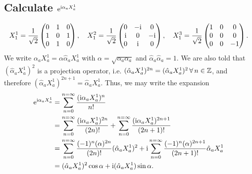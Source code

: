\documentclass[main.tex]{subfiles}
\begin{document}
\subsection{Calculate $\operatorname{e}^{\mathrm{i}\alpha_aX_a^1}$}
\begin{equation}
X^1_1=\frac{1}{\sqrt{2}}\begin{pmatrix}0&1&0\\1&0&1\\0&1&0\end{pmatrix},\quad X^2_1=\frac{1}{\sqrt{2}}\begin{pmatrix}0&-\mathrm{i}&0\\\mathrm{i}&0&-\mathrm{i}\\0&\mathrm{i}&0\end{pmatrix},\quad X^3_1=\frac{1}{\sqrt{2}}\begin{pmatrix}1&0&0\\0&0&0\\0&0&-1\end{pmatrix}.
\end{equation}
We write $\alpha_aX_a^1=\alpha\hat\alpha_aX_a^1$ with $\alpha=\sqrt{\alpha_a\alpha_a}$ and $\hat\alpha_a\hat\alpha_a=1$. We are also told that $(\hat\alpha_aX_a^1)^2$ is a projection operator, i.e. $(\hat\alpha_aX_a^1)^{2n}=(\hat\alpha_aX_a^1)^2\operatorname{\forall} n\in\mathbb{Z}$, and therefore $(\hat\alpha_aX_a^1)^{2n+1}=\hat\alpha_aX_a^1$. Thus, we may write the expansion
\begin{align}
\operatorname{e}^{\mathrm{i}\alpha_aX_a^1}&=\sum_{n=0}^{n=\infty}{\frac{(\mathrm{i}\alpha_aX_a^1)^n}{n!}}\\
&=\sum_{n=0}^{n=\infty}{\frac{(\mathrm{i}\alpha_aX_a^1)^{2n}}{(2n)!}}+\sum_{n=0}^{n=\infty}{\frac{(\mathrm{i}\alpha_aX_a^1)^{2n+1}}{(2n+1)!}}\\
&=\sum_{n=0}^{n=\infty}{\frac{(-1)^n(\alpha)^{2n}}{(2n)!}(\hat\alpha_aX_a^1)^2}+\mathrm{i}\sum_{n=0}^{n=\infty}{\frac{(-1)^n(\alpha)^{2n+1}}{(2n+1)!}\hat\alpha_aX_a^1}\\
&=(\hat\alpha_aX_a^1)^2\cos{\alpha}+\mathrm{i}(\hat\alpha_aX_a^1)\sin{\alpha}.
\end{align}
\end{document}

